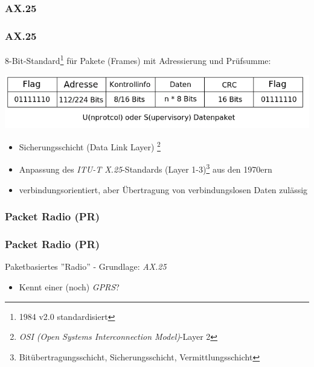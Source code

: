 \subsubsection{AX.25}

\begin{frame}
    \frametitle{AX.25}

    8-Bit-Standard\footnote{1984 v2.0 standardisiert} für Pakete (Frames) mit Adressierung und Prüfsumme:

    \begin{center}
        \includegraphics[width=1\textwidth]{e16/Ax25-US-Paket.png}
        \tiny \hyperlink{refs}{\cite{wc}}
    \end{center}

    \begin{itemize}
        \item Sicherungsschicht (Data Link Layer)
              \footnote{\emph{OSI (Open Systems Interconnection Model)}-Layer 2}
        \item Anpassung des  \emph{ITU-T X.25}-Standards (Layer
              1-3)\footnote{Bitübertragungsschicht, Sicherungsschicht,
              Vermittlungsschicht} aus den 1970ern
        \item verbindungsorientiert, aber Übertragung von verbindungslosen Daten zulässig
    \end{itemize}

\end{frame}

\subsubsection {Packet Radio (PR)}

\begin{frame}
    \frametitle{Packet Radio (PR)}

    Paketbasiertes ''Radio'' - Grundlage: \emph{AX.25}
        
    \begin{itemize}
        \item Kennt einer (noch) \emph{GPRS}?
    \end{itemize}
   
\end{frame}

